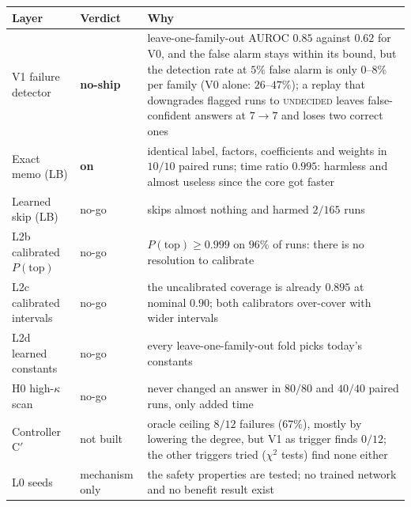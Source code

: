 \begin{center}\small
\begin{tabular}{@{}L{3.1cm}L{3.0cm}L{6.6cm}@{}}
\toprule
Layer & Verdict & Why\\\midrule
V1 failure detector & \textbf{no-ship} & leave-one-family-out AUROC $0.85$ against $0.62$ for V0, and the false alarm stays within its bound, but the detection rate at $5\%$ false alarm is only $0$--$8\%$ per family (V0 alone: $26$--$47\%$); a replay that downgrades flagged runs to \textsc{undecided} leaves false-confident answers at $7\to7$ and loses two correct ones\\
Exact memo (LB) & \textbf{on} & identical label, factors, coefficients and weights in $10/10$ paired runs; time ratio $0.995$: harmless and almost useless since the core got faster\\
Learned skip (LB) & no-go & skips almost nothing and harmed $2/165$ runs\\
L2b calibrated $P(\text{top})$ & no-go & $P(\text{top})\ge0.999$ on $96\%$ of runs: there is no resolution to calibrate\\
L2c calibrated intervals & no-go & the uncalibrated coverage is already $0.895$ at nominal $0.90$; both calibrators over-cover with wider intervals\\
L2d learned constants & no-go & every leave-one-family-out fold picks today's constants\\
H0 high-$\kappa$ scan & no-go & never changed an answer in $80/80$ and $40/40$ paired runs, only added time\\
Controller C$'$ & not built & oracle ceiling $8/12$ failures ($67\%$), mostly by lowering the degree, but V1 as trigger finds $0/12$; the other triggers tried ($\chi^2$ tests) find none either\\
L0 seeds & mechanism only & the safety properties are tested; no trained network and no benefit result exist\\
\bottomrule
\end{tabular}
\end{center}

